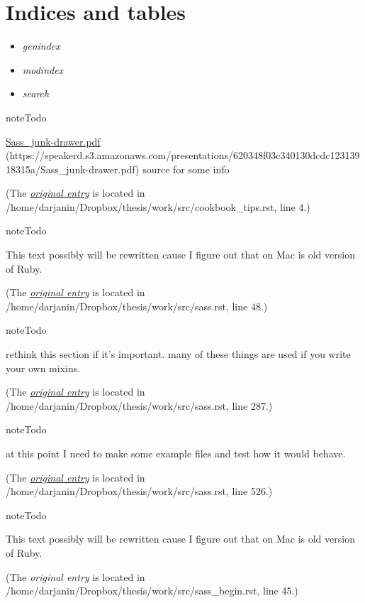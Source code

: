 \documentclass[a4paper,12pt,oneside]{sphinxmanual}
\begin{document}
\chapter{Indices and tables}
\label{index:indices-and-tables}\begin{itemize}
\item {} 
\emph{genindex}

\item {} 
\emph{modindex}

\item {} 
\emph{search}

\end{itemize}

\begin{notice}{note}{Todo}

\href{https://speakerd.s3.amazonaws.com/presentations/620348f03c340130dcdc12313918315a/Sass\_junk-drawer.pdf}{Sass\_junk-drawer.pdf} (https://speakerd.s3.amazonaws.com/presentations/620348f03c340130dcdc12313918315a/Sass\_junk-drawer.pdf) source for some info
\end{notice}

(The {\hyperref[src/cookbook_tips:index-0]{\emph{original entry}}} is located in  /home/darjanin/Dropbox/thesis/work/src/cookbook\_tips.rst, line 4.)

\begin{notice}{note}{Todo}

This text possibly will be rewritten cause I figure out that on Mac is old version of Ruby.
\end{notice}

(The {\hyperref[src/sass:index-0]{\emph{original entry}}} is located in  /home/darjanin/Dropbox/thesis/work/src/sass.rst, line 48.)

\begin{notice}{note}{Todo}

rethink this section if it's important. many of these things are used if you write your own mixins.
\end{notice}

(The {\hyperref[src/sass:index-1]{\emph{original entry}}} is located in  /home/darjanin/Dropbox/thesis/work/src/sass.rst, line 287.)

\begin{notice}{note}{Todo}

at this point I need to make some example files and test how it would behave.
\end{notice}

(The {\hyperref[src/sass:index-2]{\emph{original entry}}} is located in  /home/darjanin/Dropbox/thesis/work/src/sass.rst, line 526.)

\begin{notice}{note}{Todo}

This text possibly will be rewritten cause I figure out that on Mac is old version of Ruby.
\end{notice}

(The \emph{original entry} is located in  /home/darjanin/Dropbox/thesis/work/src/sass\_begin.rst, line 45.)



\renewcommand{\indexname}{Index}
\printindex
\end{document}
